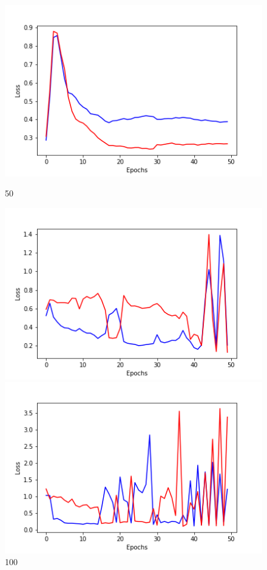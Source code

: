 \documentclass[20pt]{report}
\begin{document}
\begin{figure}[!htb]
  \includegraphics[width=\linewidth]{3_50.png}
	\caption{50}
\endminipage\hfill
{}
  \includegraphics[width=\linewidth]{3_100.png}
	\caption{100}
\endminipage\hfill
{}
  \includegraphics[width=\linewidth]{3_200.png}

\end{figure}
\end{document}
